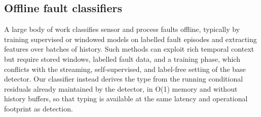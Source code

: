 \subsection{Offline fault classifiers}
A large body of work classifies sensor and process faults offline, typically by training supervised or windowed models on labelled fault episodes and extracting features over batches of history. Such methods can exploit rich temporal context but require stored windows, labelled fault data, and a training phase, which conflicts with the streaming, self-supervised, and label-free setting of the base detector. Our classifier instead derives the type from the running conditional residuals already maintained by the detector, in O(1) memory and without history buffers, so that typing is available at the same latency and operational footprint as detection.
